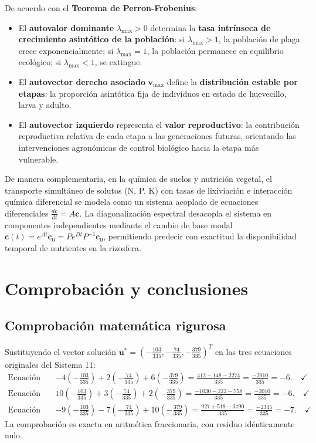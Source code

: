 \documentclass[spanish,letterpaper,oneside]{article}
\begin{document}
De acuerdo con el \textbf{Teorema de Perron-Frobenius}:
\begin{itemize}
\item El \textbf{autovalor dominante} $\lambda_{\max} > 0$ determina la \textbf{tasa intrínseca de crecimiento asintótico de la población}: si $\lambda_{\max} > 1$, la población de plaga crece exponencialmente; si $\lambda_{\max} = 1$, la población permanece en equilibrio ecológico; si $\lambda_{\max} < 1$, se extingue.
\item El \textbf{autovector derecho asociado} $\mathbf{v}_{\max}$ define la \textbf{distribución estable por etapas}: la proporción asintótica fija de individuos en estado de huevecillo, larva y adulto.
\item El \textbf{autovector izquierdo} representa el \textbf{valor reproductivo}: la contribución reproductiva relativa de cada etapa a las generaciones futuras, orientando las intervenciones agronómicas de control biológico hacia la etapa más vulnerable.
\end{itemize}

De manera complementaria, en la química de suelos y nutrición vegetal, el transporte simultáneo de solutos (N, P, K) con tasas de lixiviación e interacción química diferencial se modela como un sistema acoplado de ecuaciones diferenciales $\frac{d\mathbf{c}}{dt} = A\mathbf{c}$. La diagonalización espectral desacopla el sistema en componentes independientes mediante el cambio de base modal $\mathbf{c}(t) = e^{At}\mathbf{c}_0 = P e^{Dt} P^{-1}\mathbf{c}_0$, permitiendo predecir con exactitud la disponibilidad temporal de nutrientes en la rizosfera.

\section{Comprobación y conclusiones}

\subsection{Comprobación matemática rigurosa}
Sustituyendo el vector solución $\mathbf{u}^* = \left(-\frac{103}{335}, -\frac{74}{335}, -\frac{379}{335}\right)^T$ en las tres ecuaciones originales del Sistema 11:
\begin{align}
\text{Ecuación 1:} \quad & -4\left(-\frac{103}{335}\right) + 2\left(-\frac{74}{335}\right) + 6\left(-\frac{379}{335}\right) = \frac{412 - 148 - 2274}{335} = \frac{-2010}{335} = -6. \quad \checkmark \\
\text{Ecuación 2:} \quad & 10\left(-\frac{103}{335}\right) + 3\left(-\frac{74}{335}\right) + 2\left(-\frac{379}{335}\right) = \frac{-1030 - 222 - 758}{335} = \frac{-2010}{335} = -6. \quad \checkmark \\
\text{Ecuación 3:} \quad & -9\left(-\frac{103}{335}\right) - 7\left(-\frac{74}{335}\right) + 10\left(-\frac{379}{335}\right) = \frac{927 + 518 - 3790}{335} = \frac{-2345}{335} = -7. \quad \checkmark
\end{align}
La comprobación es exacta en aritmética fraccionaria, con residuo idénticamente nulo.
\end{document}
